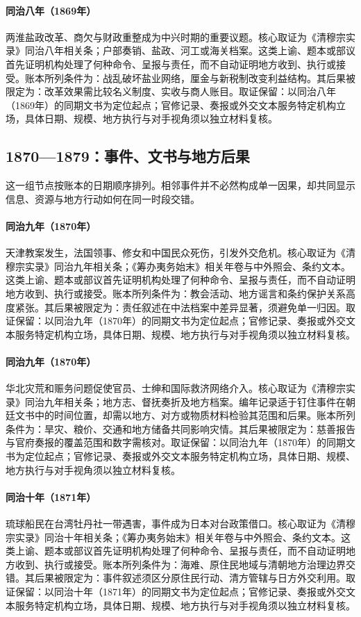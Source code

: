 \hypertarget{ledger:EQ-1869-YANGZHOU-SALT-CRISIS}{}\paragraph{同治八年（1869年）}两淮盐政改革、商欠与财政重整成为中兴时期的重要议题。核心取证为《清穆宗实录》同治八年相关条；户部奏销、盐政、河工或海关档案。这类上谕、题本或部议首先证明机构处理了何种命令、呈报与责任，而不自动证明地方收到、执行或接受。账本所列条件为：战乱破坏盐业网络，厘金与新税制改变利益结构。其后果被限定为：改革效果需比较名义制度、实收与商人账目。取证保留：以同治八年（1869年）的同期文书为定位起点；官修记录、奏报或外交文本服务特定机构立场，具体日期、规模、地方执行与对手视角须以独立材料复核。
\subsection{1870—1879：事件、文书与地方后果}
这一组节点按账本的日期顺序排列。相邻事件并不必然构成单一因果，却共同显示信息、资源与地方行动如何在同一时段交错。
\hypertarget{ledger:EQ-1870-TIANJIN-MASSACRE}{}\paragraph{同治九年（1870年）}天津教案发生，法国领事、修女和中国民众死伤，引发外交危机。核心取证为《清穆宗实录》同治九年相关条；《筹办夷务始末》相关年卷与中外照会、条约文本。这类上谕、题本或部议首先证明机构处理了何种命令、呈报与责任，而不自动证明地方收到、执行或接受。账本所列条件为：教会活动、地方谣言和条约保护关系高度紧张。其后果被限定为：责任叙述在中法档案中差异显著，须避免单一归因。取证保留：以同治九年（1870年）的同期文书为定位起点；官修记录、奏报或外交文本服务特定机构立场，具体日期、规模、地方执行与对手视角须以独立材料复核。
\hypertarget{ledger:EQ-1870-ZHILI-FAMINE-RELIEF}{}\paragraph{同治九年（1870年）}华北灾荒和赈务问题促使官员、士绅和国际救济网络介入。核心取证为《清穆宗实录》同治九年相关条；地方志、督抚奏折及地方档案。编年记录适于钉住事件在朝廷文书中的时间位置，却需以地方、对方或物质材料检验其范围和后果。账本所列条件为：旱灾、粮价、交通和地方储备共同影响灾情。其后果被限定为：慈善报告与官府奏报的覆盖范围和数字需核对。取证保留：以同治九年（1870年）的同期文书为定位起点；官修记录、奏报或外交文本服务特定机构立场，具体日期、规模、地方执行与对手视角须以独立材料复核。
\hypertarget{ledger:EQ-1871-MUDAN-INCIDENT}{}\paragraph{同治十年（1871年）}琉球船民在台湾牡丹社一带遇害，事件成为日本对台政策借口。核心取证为《清穆宗实录》同治十年相关条；《筹办夷务始末》相关年卷与中外照会、条约文本。这类上谕、题本或部议首先证明机构处理了何种命令、呈报与责任，而不自动证明地方收到、执行或接受。账本所列条件为：海难、原住民地域与清朝地方治理边界交错。其后果被限定为：事件叙述须区分原住民行动、清方管辖与日方外交利用。取证保留：以同治十年（1871年）的同期文书为定位起点；官修记录、奏报或外交文本服务特定机构立场，具体日期、规模、地方执行与对手视角须以独立材料复核。
